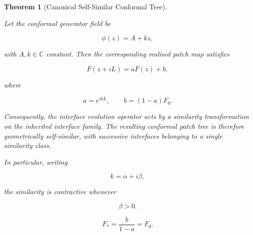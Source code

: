 \documentclass[10pt,a4paper]{amsart}
\newtheorem{theorem}{Theorem}
\begin{document}
\begin{theorem}[Canonical Self-Similar Conformal Tree]
\label{cor:canonical_selfsimilar}

Let the conformal generator field be

\[
    \phi(z)=A+kz,
\]

with $A,k\in\mathbb{C}$ constant. Then the corresponding realised
patch map satisfies

\[
    F(z+iL)
    =
    aF(z)+b,
\]

where

\[
    a=e^{ikL},
    \qquad
    b=(1-a)F_0.
\]

Consequently, the interface evolution operator acts by a similarity
transformation on the inherited interface family. The resulting
conformal patch tree is therefore geometrically self-similar, with
successive interfaces belonging to a single similarity class.

In particular, writing

\[
k=\alpha+i\beta,
\]

the similarity is contractive whenever

\[
\beta>0.
\]

\[
    F_*=\frac{b}{1-a}=F_0.
\]

\end{theorem}
\end{document}
